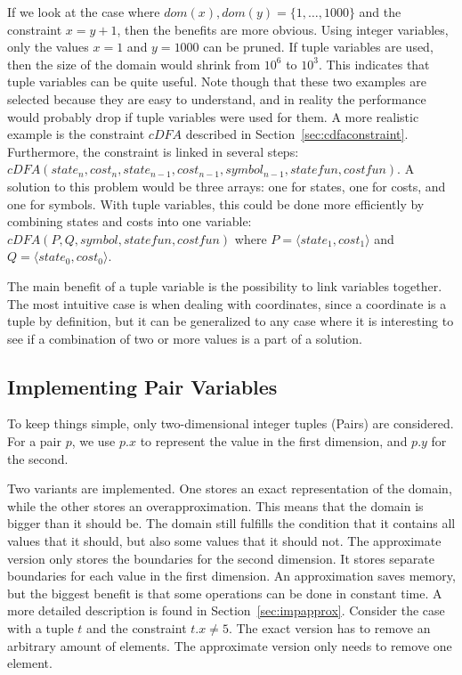 \documentclass[a4paper,11pt]{article}
\begin{document}
If we look at the case where $dom(x),dom(y)=\{1,\ldots,1000\}$ and the constraint $x=y+1$, then the benefits are more obvious. Using integer variables, only the values $x=1$ and $y=1000$ can be pruned. If tuple variables are used, then the size of the domain would shrink from $10^6$ to $10^3$. This indicates that tuple variables can be quite useful. Note though that these two examples are selected because they are easy to understand, and in reality the performance would probably drop if tuple variables were used for them. A more realistic example is the constraint $cDFA$ described in Section~\ref{sec:cdfaconstraint}. Furthermore, the constraint is linked in several steps: $cDFA(state_n, cost_n, state_{n-1}, cost_{n-1}, symbol_{n-1}, statefun, costfun)$. A solution to this problem would be three arrays: one for states, one for costs, and one for symbols. With tuple variables, this could be done more efficiently by combining states and costs into one variable: $cDFA(P, Q, symbol, statefun, costfun)$ where $P=\langle state_1, cost_1\rangle$ and $Q=\langle state_0, cost_0\rangle$.

The main benefit of a tuple variable is the possibility to link variables together. The most intuitive case is when dealing with coordinates, since a coordinate is a tuple by definition, but it can be generalized to any case where it is interesting to see if a combination of two or more values is a part of a solution. 

\subsection{Implementing Pair Variables}
To keep things simple, only two-dimensional integer tuples (Pairs) are considered. For a pair $p$, we use $p.x$ to represent the value in the first dimension, and $p.y$ for the second. 

Two variants are implemented. One stores an exact representation of the domain, while the other stores an overapproximation. This means that the domain is bigger than it should be. The domain still fulfills the condition that it contains all values that it should, but also some values that it should not. The approximate version only stores the boundaries for the second dimension. It stores separate boundaries for each value in the first dimension. An approximation saves memory, but the biggest benefit is that some operations can be done in constant time. A more detailed description is found in Section~\ref{sec:impapprox}. Consider the case with a tuple $t$ and the constraint $t.x\neq5$. The exact version has to remove an arbitrary amount of elements. The approximate version only needs to remove one element. 
\end{document}
